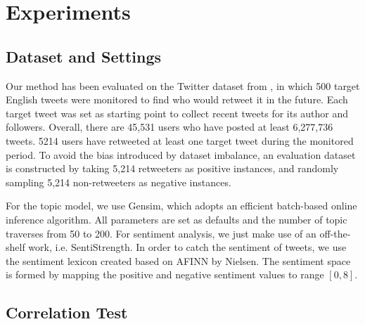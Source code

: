 \documentclass[letterpaper]{article}
\begin{document}
\section{Experiments}
\label{experiments}

\subsection{Dataset and Settings}
Our method has been evaluated on the Twitter dataset from \cite{Luo:2013RMF}, in which 500 target English tweets were monitored to find who would retweet it in the future. 
Each target tweet was set as starting point to collect recent tweets for its author and followers.
Overall, there are 45,531 users who have posted at least 6,277,736 tweets. 5214 users have retweeted at least one target tweet during the monitored period. To avoid the bias introduced by dataset imbalance, an evaluation dataset is constructed by taking 5,214 retweeters as positive instances, and randomly sampling 5,214 non-retweeters as negative instances. 

For the topic model, we use Gensim\cite{rehurek_lrec}, which adopts an efficient batch-based online inference algorithm. All parameters are set as defaults and the number of topic traverses from 50 to 200. For sentiment analysis, we just make use of an off-the-shelf work, i.e. SentiStrength\cite{thelwall2010sentiment}. In order to catch the sentiment of tweets, we use the sentiment lexicon created based on AFINN by Nielsen\cite{MohammadKZ2013}. The sentiment space is formed by mapping the positive and negative sentiment values to range $ [0,8] $.

\subsection{Correlation Test}
\end{document}
